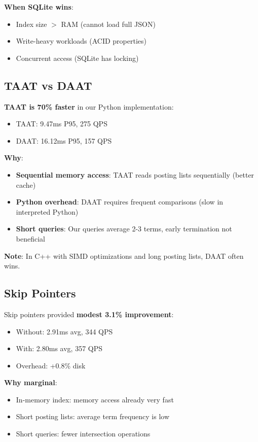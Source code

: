 \documentclass[12pt,a4paper]{article}
\begin{document}
\textbf{When SQLite wins}:
\begin{itemize}
    \item Index size $>$ RAM (cannot load full JSON)
    \item Write-heavy workloads (ACID properties)
    \item Concurrent access (SQLite has locking)
\end{itemize}

\subsection{TAAT vs DAAT}

\textbf{TAAT is 70\% faster} in our Python implementation:
\begin{itemize}
    \item TAAT: 9.47ms P95, 275 QPS
    \item DAAT: 16.12ms P95, 157 QPS
\end{itemize}

\textbf{Why}:
\begin{itemize}
    \item \textbf{Sequential memory access}: TAAT reads posting lists sequentially (better cache)
    \item \textbf{Python overhead}: DAAT requires frequent comparisons (slow in interpreted Python)
    \item \textbf{Short queries}: Our queries average 2-3 terms, early termination not beneficial
\end{itemize}

\textbf{Note}: In C++ with SIMD optimizations and long posting lists, DAAT often wins.

\subsection{Skip Pointers}

Skip pointers provided \textbf{modest 3.1\% improvement}:
\begin{itemize}
    \item Without: 2.91ms avg, 344 QPS
    \item With: 2.80ms avg, 357 QPS
    \item Overhead: +0.8\% disk
\end{itemize}

\textbf{Why marginal}:
\begin{itemize}
    \item In-memory index: memory access already very fast
    \item Short posting lists: average term frequency is low
    \item Short queries: fewer intersection operations
\end{itemize}
\end{document}
